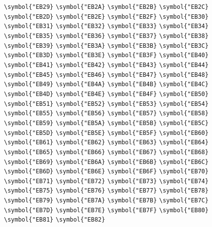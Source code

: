 \documentclass{ctexbook}
\begin{document}
 \verb|\symbol{"EB29}|  \verb|\symbol{"EB2A}|  \verb|\symbol{"EB2B}|  \verb|\symbol{"EB2C}|  \verb|\symbol{"EB2D}|  \verb|\symbol{"EB2E}|  \verb|\symbol{"EB2F}|  \verb|\symbol{"EB30}|  \verb|\symbol{"EB31}|  \verb|\symbol{"EB32}|  \verb|\symbol{"EB33}|  \verb|\symbol{"EB34}|  \verb|\symbol{"EB35}|  \verb|\symbol{"EB36}|  \verb|\symbol{"EB37}|  \verb|\symbol{"EB38}|  \verb|\symbol{"EB39}|  \verb|\symbol{"EB3A}|  \verb|\symbol{"EB3B}|  \verb|\symbol{"EB3C}|  \verb|\symbol{"EB3D}|  \verb|\symbol{"EB3E}|  \verb|\symbol{"EB3F}|  \verb|\symbol{"EB40}|  \verb|\symbol{"EB41}|  \verb|\symbol{"EB42}|  \verb|\symbol{"EB43}|  \verb|\symbol{"EB44}|  \verb|\symbol{"EB45}|  \verb|\symbol{"EB46}|  \verb|\symbol{"EB47}|  \verb|\symbol{"EB48}|  \verb|\symbol{"EB49}|  \verb|\symbol{"EB4A}|  \verb|\symbol{"EB4B}|  \verb|\symbol{"EB4C}|  \verb|\symbol{"EB4D}|  \verb|\symbol{"EB4E}|  \verb|\symbol{"EB4F}|  \verb|\symbol{"EB50}|  \verb|\symbol{"EB51}|  \verb|\symbol{"EB52}|  \verb|\symbol{"EB53}|  \verb|\symbol{"EB54}|  \verb|\symbol{"EB55}|  \verb|\symbol{"EB56}|  \verb|\symbol{"EB57}|  \verb|\symbol{"EB58}|  \verb|\symbol{"EB59}|  \verb|\symbol{"EB5A}|  \verb|\symbol{"EB5B}|  \verb|\symbol{"EB5C}|  \verb|\symbol{"EB5D}|  \verb|\symbol{"EB5E}|  \verb|\symbol{"EB5F}|  \verb|\symbol{"EB60}|  \verb|\symbol{"EB61}|  \verb|\symbol{"EB62}|  \verb|\symbol{"EB63}|  \verb|\symbol{"EB64}|  \verb|\symbol{"EB65}|  \verb|\symbol{"EB66}|  \verb|\symbol{"EB67}|  \verb|\symbol{"EB68}|  \verb|\symbol{"EB69}|  \verb|\symbol{"EB6A}|  \verb|\symbol{"EB6B}|  \verb|\symbol{"EB6C}|  \verb|\symbol{"EB6D}|  \verb|\symbol{"EB6E}|  \verb|\symbol{"EB6F}|  \verb|\symbol{"EB70}|  \verb|\symbol{"EB71}|  \verb|\symbol{"EB72}|  \verb|\symbol{"EB73}|  \verb|\symbol{"EB74}|  \verb|\symbol{"EB75}|  \verb|\symbol{"EB76}|  \verb|\symbol{"EB77}|  \verb|\symbol{"EB78}|  \verb|\symbol{"EB79}|  \verb|\symbol{"EB7A}|  \verb|\symbol{"EB7B}|  \verb|\symbol{"EB7C}|  \verb|\symbol{"EB7D}|  \verb|\symbol{"EB7E}|  \verb|\symbol{"EB7F}|  \verb|\symbol{"EB80}|  \verb|\symbol{"EB81}|  \verb|\symbol{"EB82}| 
\end{document}
